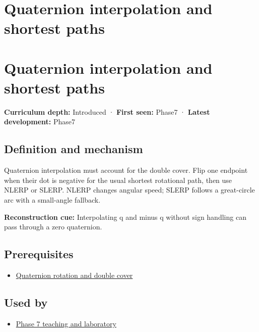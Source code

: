 \hypertarget{appendix-9b4b8254f26b}{}
\section*{Quaternion interpolation and shortest paths}
\section{Quaternion interpolation and shortest paths}\label{quaternion-interpolation-and-shortest-paths}

\textbf{Curriculum depth:} Introduced · \textbf{First seen:} Phase7 · \textbf{Latest development:} Phase7

\subsection{Definition and mechanism}\label{definition-and-mechanism}

Quaternion interpolation must account for the double cover. Flip one endpoint when their dot is negative for the usual shortest rotational path, then use NLERP or SLERP. NLERP changes angular speed; SLERP follows a great-circle arc with a small-angle fallback.

\textbf{Reconstruction cue:} Interpolating q and minus q without sign handling can pass through a zero quaternion.

\subsection{Prerequisites}\label{prerequisites}

\begin{itemize}
\tightlist
\item
  \hyperref[appendix-8e61ab68f6b2]{Quaternion rotation and double cover}
\end{itemize}

\subsection{Used by}\label{used-by}

\begin{itemize}
\tightlist
\item
  \href{Continuous\%20Notes/Computing\%20Foundations\%20-\%20From\%20Bits\%20to\%20C++\%20and\%20Systems\%20APIs\#Keep\%20the\%20promises\%20visible\%20while\%20moving\%20between\%20representations}{Phase 7 teaching and laboratory}
\end{itemize}

